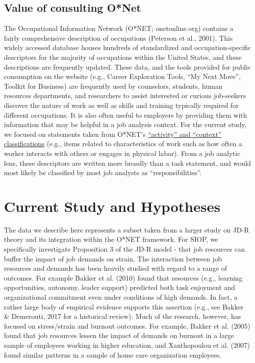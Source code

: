 \documentclass[
  man]{apa6}
\begin{document}
\hypertarget{value-of-consulting-onet}{%
\subsection{Value of consulting O*Net}\label{value-of-consulting-onet}}

The Occupational Information Network (O*NET; onetonline.org) contains a fairly comprehensive description of occupations (Peterson et al., 2001). This widely accessed database houses hundreds of standardized and occupation-specific descriptors for the majority of occupations within the United States, and these descriptions are frequently updated. These data, and the tools provided for public consumption on the website (e.g., Career Exploration Tools, ``My Next Move'', Toolkit for Business) are frequently used by counselors, students, human resources departments, and researchers to assist interested or curious job-seekers discover the nature of work as well as skills and training typically required for different occupations. It is also often useful to employers by providing them with information that may be helpful in a job analysis context. For the current study, we focused on statements taken from O*NET's \href{https://www.O*NETonline.org/find/descriptor/result/4.A.1.b.3}{``activity'' and ``context'' classifications} (e.g., items related to characteristics of work such as how often a worker interacts with others or engages in physical labor). From a job analytic lens, these descriptors are written more broadly than a task statement, and would most likely be classified by most job analysts as ``responsibilities''.

\hypertarget{current-study-and-hypotheses}{%
\section{Current Study and Hypotheses}\label{current-study-and-hypotheses}}

The data we describe here represents a subset taken from a larger study on JD-R theory and its integration within the O*NET framework. For SIOP, we specifically investigate Proposition 3 of the JD-R model - that job resources can buffer the impact of job demands on strain. The interaction between job resources and demands has been heavily studied with regard to a range of outcomes. For example Bakker et al. (2010) found that resources (e.g., learning opportunities, autonomy, leader support) predicted both task enjoyment and organizational commitment even under conditions of high demands. In fact, a rather large body of empirical evidence supports this assertion (e.g., see Bakker \& Demerouti, 2017 for a historical review). Much of the research, however, has focused on stress/strain and burnout outcomes. For example, Bakker et al. (2005) found that job resources lessen the impact of demands on burnout in a large sample of employees working in higher education, and Xanthopoulou et al. (2007) found similar patterns in a sample of home care organization employees.
\end{document}
